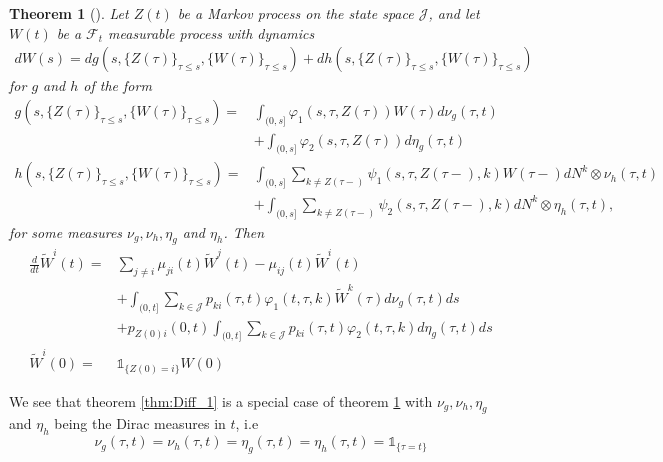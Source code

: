 \documentclass[12pt]{article}
\newcommand{\indic}[1]{\mathds{1}_{ \{ #1 \} }}
\theoremstyle{my_thm}
\newtheorem{thm}{Theorem}[section]
\begin{document}
\begin{thm}[]
\label{thm:Diff_2}
Let $Z(t)$ be a Markov process on the state space $\mathcal{J}$, and let $W(t)$ be a $\mathcal{F}_t$ measurable process with dynamics
\begin{align*}
dW(s)= d g(s,\{Z(\tau)\}_{\tau\leq s},\{W(\tau)\}_{\tau\leq s})+
 d h(s,\{Z(\tau)\}_{\tau\leq s},\{W(\tau)\}_{\tau\leq s})
\end{align*}
for $g$ and $h$ of the form
\begin{align*}
g(s,\{Z(\tau)\}_{\tau\leq s},\{W(\tau)\}_{\tau\leq s})=&\int_{(0,s]} \varphi_1(s,\tau,Z(\tau))W(\tau) d\nu_g(\tau,t)
\\
&+
\int_{(0,s]} \varphi_2(s,\tau,Z(\tau)) d\eta_g(\tau,t)
\\
h(s,\{Z(\tau)\}_{\tau\leq s},\{W(\tau)\}_{\tau\leq s})=&\int_{(0,s]} \sum_{k\neq Z(\tau-)} \psi_1(s,\tau,Z(\tau-),k) W(\tau-)  dN^k\otimes\nu_h(\tau,t)
\\
&+
\int_{(0,s]} \sum_{k\neq Z(\tau-)} \psi_2(s,\tau,Z(\tau-),k)  dN^k\otimes\eta_h(\tau,t),
\end{align*}
for some measures $\nu_g,\nu_h,\eta_g$ and $\eta_h$.
Then
\begin{align*}
\frac{d}{dt}\tilde{W}^i(t)=&
\sum_{j \neq i} \mu_{ji}(t) \tilde{W}^j(t)-\mu_{ij}(t)\tilde{W}^i(t)
\\
&+
\int_{(0,t]} \sum_{k \in \mathcal{J}} p_{ki}(\tau,t) \varphi_1(t,\tau,k) \tilde{W}^k(\tau) d\nu_g(\tau,t) ds
\\
&+
p_{Z(0)i}(0,t)\int_{(0,t]} \sum_{k \in \mathcal{J}} p_{ki}(\tau,t) \varphi_2(t,\tau,k) d\eta_g(\tau,t) ds
\\
\tilde{W}^i(0)=&\indic{Z(0)=i}W(0)
\end{align*}

\end{thm}
We see that theorem \ref{thm:Diff_1} is a special case of theorem \ref{thm:Diff_2} with $\nu_g,\nu_h,\eta_g$ and $\eta_h$ being the Dirac measures in $t$, i.e 
$$
\nu_g(\tau,t)=\nu_h(\tau,t)=\eta_g(\tau,t)=\eta_h(\tau,t)=\indic{\tau=t}
$$
\end{document}
